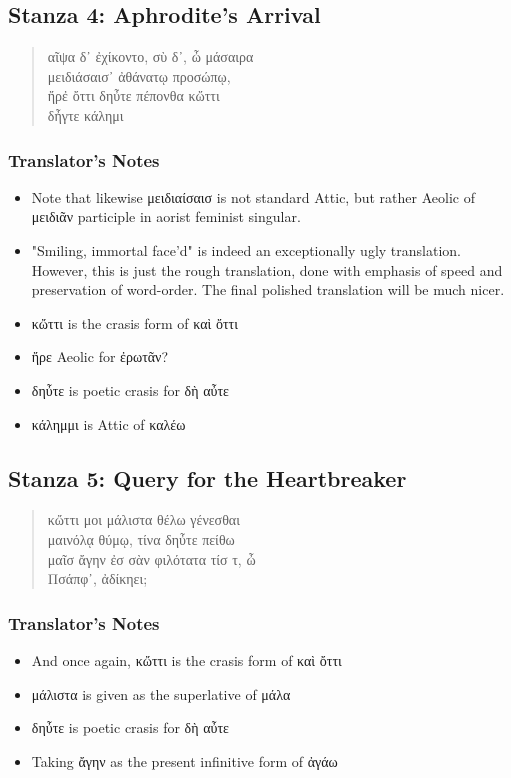 \subsection*{Stanza 4: Aphrodite's Arrival}
\begin{quote}
  αῖψα δ᾽ ἐχίκοντο, σὺ δ᾽, ὦ μάσαιρα\\
  μειδιάσαισ᾽ ἀθάνατῳ προσώπῳ,\\
  ἤρἐ ὄττι δηὖτε πέπονθα κὤττι\\
  δἦγτε κάλημι
\end{quote}

\subsubsection*{Translator's Notes}
\begin{itemize}
  \item Note that likewise μειδιαίσαισ is not standard Attic, but rather Aeolic of μειδιᾶν participle in aorist feminist singular.
  \item "Smiling, immortal face'd" is indeed an exceptionally ugly translation. However, this is just the rough translation, done with emphasis of speed and preservation of word-order. The final polished translation will be much nicer.
  \item κὤττι is the crasis form of καὶ ὄττι
  \item ἤρε Aeolic for ἐρωτᾶν?
  \item δηὖτε is poetic crasis for δὴ αὖτε
  \item κάλημμι is Attic of καλέω
\end{itemize}

\subsection*{Stanza 5: Query for the Heartbreaker}
\begin{quote}
  κὤττι μοι μάλιστα θέλω γένεσθαι\\
  μαινόλᾳ θύμῳ, τίνα δηὖτε πείθω\\
  μαῖσ ἄγην ἐσ σὰν φιλότατα τίσ τ, ὦ\\
  Πσάπφ᾽, ἀδίκηει;
\end{quote}

\subsubsection*{Translator's Notes}
\begin{itemize}
  \item And once again, κὤττι is the crasis form of καὶ ὄττι
  \item μάλιστα is given as the superlative of μάλα
  \item δηὖτε is poetic crasis for δὴ αὖτε
  \item Taking ἄγην as the present infinitive form of ἀγάω
\end{itemize}

